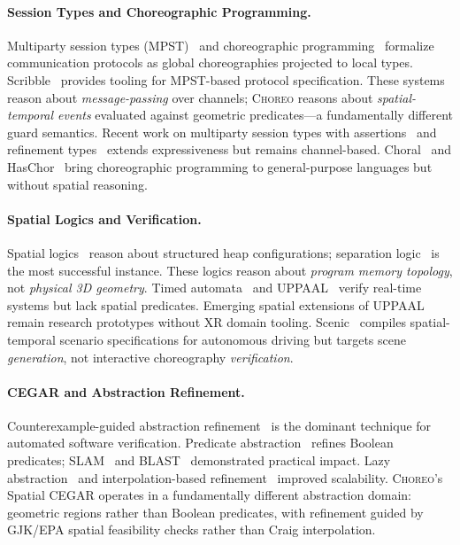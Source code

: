 \documentclass[11pt,a4paper]{article}
\begin{document}
\paragraph{Session Types and Choreographic Programming.}
Multiparty session types (MPST)~\cite{honda2008,honda2016} and choreographic
programming~\cite{montesi2013,hirsch2022} formalize communication protocols as
global choreographies projected to local types.
Scribble~\cite{yoshida2014} provides tooling for MPST-based protocol specification.
These systems reason about \emph{message-passing} over channels; \textsc{Choreo}
reasons about \emph{spatial-temporal events} evaluated against geometric predicates---a
fundamentally different guard semantics.
Recent work on multiparty session types with assertions~\cite{bocchi2017} and
refinement types~\cite{zhou2020} extends expressiveness but remains
channel-based.
Choral~\cite{giallorenzo2024} and HasChor~\cite{shen2023} bring choreographic
programming to general-purpose languages but without spatial reasoning.

\paragraph{Spatial Logics and Verification.}
Spatial logics~\cite{cardelli2001,calcagno2007} reason about structured heap
configurations; separation logic~\cite{reynolds2002,ohearn2019} is the most
successful instance.
These logics reason about \emph{program memory topology}, not \emph{physical 3D
geometry}.
Timed automata~\cite{alur1994} and UPPAAL~\cite{uppaal2004} verify real-time
systems but lack spatial predicates.
Emerging spatial extensions of UPPAAL~\cite{fahrenberg2011} remain research
prototypes without XR domain tooling.
Scenic~\cite{fremont2019} compiles spatial-temporal scenario specifications for
autonomous driving but targets scene \emph{generation}, not interactive choreography
\emph{verification}.

\paragraph{CEGAR and Abstraction Refinement.}
Counterexample-guided abstraction refinement~\cite{clarke2000,clarke2003}
is the dominant technique for automated software verification.
Predicate abstraction~\cite{graf1997,ball2001} refines Boolean predicates;
SLAM~\cite{ball2002} and BLAST~\cite{henzinger2002} demonstrated practical impact.
Lazy abstraction~\cite{mcmillan2006} and interpolation-based
refinement~\cite{mcmillan2003} improved scalability.
\textsc{Choreo}'s Spatial CEGAR operates in a fundamentally different abstraction
domain: geometric regions rather than Boolean predicates, with refinement guided
by GJK/EPA spatial feasibility checks rather than Craig interpolation.
\end{document}
